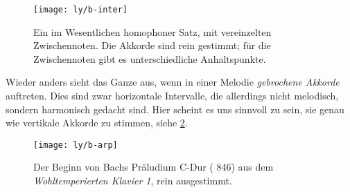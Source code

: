 \begin{figure}[h]
  \centering
  \texttt{[image: ly/b-inter]}
  \caption{Ein im Wesentlichen homophoner Satz, mit vereinzelten
    Zwischennoten. Die Akkorde sind rein gestimmt; für die Zwischennoten gibt
    es unterschiedliche Anhaltspunkte.}\label{fig:inter}
\end{figure}

Wieder anders sieht das Ganze aus, wenn in einer Melodie \emph{gebrochene
  Akkorde} auftreten. Dies sind zwar horizontale Intervalle, die allerdings
nicht melodisch, sondern harmonisch gedacht sind. Hier scheint es uns sinnvoll
zu sein, sie genau wie vertikale Akkorde zu stimmen, siehe \cref{fig:arp}.


\begin{figure}
  \centering
  \texttt{[image: ly/b-arp]}
  \caption{Der Beginn von Bachs Präludium C-Dur ( 846) aus dem
    \emph{Wohltemperierten Klavier 1}, rein ausgestimmt.}\label{fig:arp}
\end{figure}

